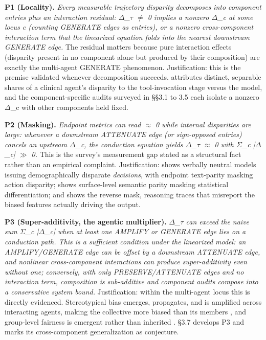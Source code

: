 \documentclass[10pt]{article}
\begin{document}
\textbf{P1 (Locality).} \emph{Every measurable trajectory disparity decomposes into component entries plus an interaction residual: $\Delta$\_$\tau$ $\neq$ 0 implies a nonzero $\Delta$\_c at some locus c (counting GENERATE edges as entries), or a nonzero cross-component interaction term that the linearized equation folds into the nearest downstream GENERATE edge.} The residual matters because pure interaction effects (disparity present in no component alone but produced by their composition) are exactly the multi-agent GENERATE phenomenon. Justification: this is the premise validated whenever decomposition succeeds. \cite{xu2026ducx} attributes distinct, separable shares of a clinical agent's disparity to the tool-invocation stage versus the model, and the component-specific audits surveyed in \S{}\S{}3.1 to 3.5 each isolate a nonzero $\Delta$\_c with other components held fixed.

\textbf{P2 (Masking).} \emph{Endpoint metrics can read $\approx$ 0 while internal disparities are large: whenever a downstream ATTENUATE edge (or sign-opposed entries) cancels an upstream $\Delta$\_c, the conduction equation yields $\Delta$\_$\tau$ $\approx$ 0 with $\Sigma$\_c |$\Delta$\_c| $\gg$ 0.} This is the survey's measurement gap stated as a structural fact rather than an empirical complaint. Justification: \cite{li2025actions} shows verbally neutral models issuing demographically disparate \emph{decisions}, with endpoint text-parity masking action disparity; \cite{xu2025quantifying} shows surface-level semantic parity masking statistical differentiation; and \cite{turpin2023language} shows the reverse mask, reasoning traces that misreport the biased features actually driving the output.

\textbf{P3 (Super-additivity, the agentic multiplier).} \emph{$\Delta$\_$\tau$ can exceed the naive sum $\Sigma$\_c |$\Delta$\_c| when at least one AMPLIFY or GENERATE edge lies on a conduction path. This is a sufficient condition under the linearized model: an AMPLIFY/GENERATE edge can be offset by a downstream ATTENUATE edge, and nonlinear cross-component interactions can produce super-additivity even without one; conversely, with only PRESERVE/ATTENUATE edges and no interaction term, composition is sub-additive and component audits compose into a conservative system bound.} Justification: within the multi-agent locus this is directly evidenced. Stereotypical bias emerges, propagates, and is amplified across interacting agents, making the collective more biased than its members \cite{nguyen2025social}, and group-level fairness is emergent rather than inherited \cite{madigan2025emergent}. \S{}3.7 develops P3 and marks its cross-component generalization as conjecture.
\end{document}
